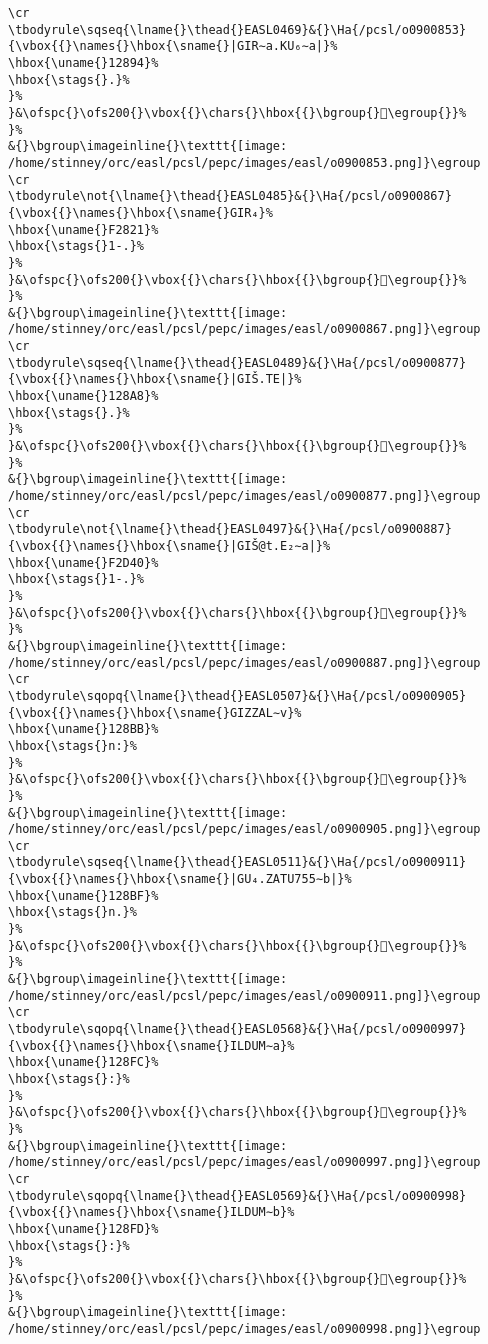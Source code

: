 \begin{verbatim}
\cr
\tbodyrule\sqseq{\lname{}\thead{}EASL0469}&{}\Ha{/pcsl/o0900853}{\vbox{{}\names{}\hbox{\sname{}|GIR∼a.KU₆∼a|}%
\hbox{\uname{}12894}%
\hbox{\stags{}.}%
}%
}&\ofspc{}\ofs200{}\vbox{{}\chars{}\hbox{{}\bgroup{}𒢔\egroup{}}%
}%
&{}\bgroup\imageinline{}\texttt{[image: /home/stinney/orc/easl/pcsl/pepc/images/easl/o0900853.png]}\egroup
\cr
\tbodyrule\not{\lname{}\thead{}EASL0485}&{}\Ha{/pcsl/o0900867}{\vbox{{}\names{}\hbox{\sname{}GIR₄}%
\hbox{\uname{}F2821}%
\hbox{\stags{}1-.}%
}%
}&\ofspc{}\ofs200{}\vbox{{}\chars{}\hbox{{}\bgroup{}󲠡\egroup{}}%
}%
&{}\bgroup\imageinline{}\texttt{[image: /home/stinney/orc/easl/pcsl/pepc/images/easl/o0900867.png]}\egroup
\cr
\tbodyrule\sqseq{\lname{}\thead{}EASL0489}&{}\Ha{/pcsl/o0900877}{\vbox{{}\names{}\hbox{\sname{}|GIŠ.TE|}%
\hbox{\uname{}128A8}%
\hbox{\stags{}.}%
}%
}&\ofspc{}\ofs200{}\vbox{{}\chars{}\hbox{{}\bgroup{}𒢨\egroup{}}%
}%
&{}\bgroup\imageinline{}\texttt{[image: /home/stinney/orc/easl/pcsl/pepc/images/easl/o0900877.png]}\egroup
\cr
\tbodyrule\not{\lname{}\thead{}EASL0497}&{}\Ha{/pcsl/o0900887}{\vbox{{}\names{}\hbox{\sname{}|GIŠ@t.E₂∼a|}%
\hbox{\uname{}F2D40}%
\hbox{\stags{}1-.}%
}%
}&\ofspc{}\ofs200{}\vbox{{}\chars{}\hbox{{}\bgroup{}󲵀\egroup{}}%
}%
&{}\bgroup\imageinline{}\texttt{[image: /home/stinney/orc/easl/pcsl/pepc/images/easl/o0900887.png]}\egroup
\cr
\tbodyrule\sqopq{\lname{}\thead{}EASL0507}&{}\Ha{/pcsl/o0900905}{\vbox{{}\names{}\hbox{\sname{}GIZZAL∼v}%
\hbox{\uname{}128BB}%
\hbox{\stags{}n:}%
}%
}&\ofspc{}\ofs200{}\vbox{{}\chars{}\hbox{{}\bgroup{}𒢻\egroup{}}%
}%
&{}\bgroup\imageinline{}\texttt{[image: /home/stinney/orc/easl/pcsl/pepc/images/easl/o0900905.png]}\egroup
\cr
\tbodyrule\sqseq{\lname{}\thead{}EASL0511}&{}\Ha{/pcsl/o0900911}{\vbox{{}\names{}\hbox{\sname{}|GU₄.ZATU755∼b|}%
\hbox{\uname{}128BF}%
\hbox{\stags{}n.}%
}%
}&\ofspc{}\ofs200{}\vbox{{}\chars{}\hbox{{}\bgroup{}𒢿\egroup{}}%
}%
&{}\bgroup\imageinline{}\texttt{[image: /home/stinney/orc/easl/pcsl/pepc/images/easl/o0900911.png]}\egroup
\cr
\tbodyrule\sqopq{\lname{}\thead{}EASL0568}&{}\Ha{/pcsl/o0900997}{\vbox{{}\names{}\hbox{\sname{}ILDUM∼a}%
\hbox{\uname{}128FC}%
\hbox{\stags{}:}%
}%
}&\ofspc{}\ofs200{}\vbox{{}\chars{}\hbox{{}\bgroup{}𒣼\egroup{}}%
}%
&{}\bgroup\imageinline{}\texttt{[image: /home/stinney/orc/easl/pcsl/pepc/images/easl/o0900997.png]}\egroup
\cr
\tbodyrule\sqopq{\lname{}\thead{}EASL0569}&{}\Ha{/pcsl/o0900998}{\vbox{{}\names{}\hbox{\sname{}ILDUM∼b}%
\hbox{\uname{}128FD}%
\hbox{\stags{}:}%
}%
}&\ofspc{}\ofs200{}\vbox{{}\chars{}\hbox{{}\bgroup{}𒣽\egroup{}}%
}%
&{}\bgroup\imageinline{}\texttt{[image: /home/stinney/orc/easl/pcsl/pepc/images/easl/o0900998.png]}\egroup

\end{verbatim}
